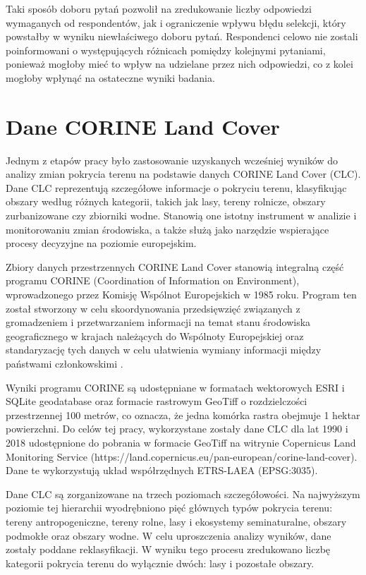 \documentclass{amuthesis}
\begin{document}
Taki sposób doboru pytań pozwolił na zredukowanie liczby odpowiedzi
wymaganych od respondentów, jak i ograniczenie wpływu błędu selekcji,
który powstałby w wyniku niewłaściwego doboru pytań. Respondenci celowo
nie zostali poinformowani o występujących różnicach pomiędzy kolejnymi
pytaniami, ponieważ mogłoby mieć to wpływ na udzielane przez nich
odpowiedzi, co z kolei mogłoby wpłynąć na ostateczne wyniki badania.

\hypertarget{sec-CLC}{%
\section{Dane CORINE Land Cover}\label{sec-CLC}}

Jednym z etapów pracy było zastosowanie uzyskanych wcześniej wyników do
analizy zmian pokrycia terenu na podstawie danych CORINE Land Cover
(CLC). Dane CLC reprezentują szczegółowe informacje o pokryciu terenu,
klasyfikując obszary według różnych kategorii, takich jak lasy, tereny
rolnicze, obszary zurbanizowane czy zbiorniki wodne. Stanowią one
istotny instrument w analizie i monitorowaniu zmian środowiska, a także
służą jako narzędzie wspierające procesy decyzyjne na poziomie
europejskim.

Zbiory danych przestrzennych CORINE Land Cover stanowią integralną część
programu CORINE (Coordination of Information on Environment),
wprowadzonego przez Komisję Wspólnot Europejskich w 1985 roku. Program
ten został stworzony w celu skoordynowania przedsięwzięć związanych z
gromadzeniem i przetwarzaniem informacji na temat stanu środowiska
geograficznego w krajach należących do Wspólnoty Europejskiej oraz
standaryzację tych danych w celu ułatwienia wymiany informacji między
państwami członkowskimi \autocite{Bielecka_Ciolkosz_2004}.

Wyniki programu CORINE są udostępniane w formatach wektorowych ESRI i
SQLite geodatabase oraz formacie rastrowym GeoTiff o rozdzielczości
przestrzennej 100 metrów, co oznacza, że jedna komórka rastra obejmuje 1
hektar powierzchni. Do celów tej pracy, wykorzystane zostały dane CLC
dla lat 1990 i 2018 udostępnione do pobrania w formacie GeoTiff na
witrynie Copernicus Land Monitoring Service
(https://land.copernicus.eu/pan-european/corine-land-cover). Dane te
wykorzystują układ współrzędnych ETRS-LAEA (EPSG:3035).

Dane CLC są zorganizowane na trzech poziomach szczegółowości. Na
najwyższym poziomie tej hierarchii wyodrębniono pięć głównych typów
pokrycia terenu: tereny antropogeniczne, tereny rolne, lasy i ekosystemy
seminaturalne, obszary podmokłe oraz obszary wodne. W celu uproszczenia
analizy wyników, dane zostały poddane reklasyfikacji. W wyniku tego
procesu zredukowano liczbę kategorii pokrycia terenu do wyłącznie dwóch:
lasy i pozostałe obszary.
\end{document}
